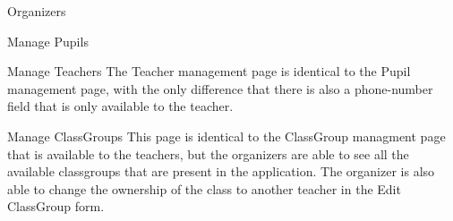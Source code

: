 \documentclass[]{article}
\begin{document}
\begin{section}{Organizers}
\begin{subsection}{Manage Pupils}
	\end{subsection}
	
	\begin{subsection}{Manage Teachers}
		The Teacher management page is identical to the Pupil management page, with the
		only difference that there is also a phone-number field that is only available
		to the teacher.
	\end{subsection}
	
	\begin{subsection}{Manage ClassGroups}
		This page is identical to the ClassGroup managment page that is available to the
		teachers, but the organizers are able to see all the available classgroups that
		are present in the application. The organizer is also able to change the ownership
		of the class to another teacher in the Edit ClassGroup form.
	\end{subsection}
	

\end{section}
\end{document}
